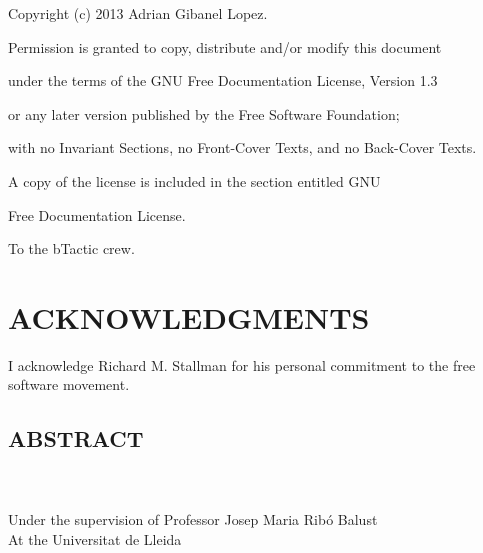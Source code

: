 Copyright (c) 2013 Adrian Gibanel Lopez.

Permission is granted to copy, distribute and/or modify this document

under the terms of the GNU Free Documentation License, Version 1.3

or any later version published by the Free Software Foundation;

with no Invariant Sections, no Front-Cover Texts, and no Back-Cover
Texts.

A copy of the license is included in the section entitled \textquotedbl{}GNU

Free Documentation License\textquotedbl{}.

\newpage



\newpage
\null\vfil
\begin{center}
To the bTactic crew.
\end{center}
\par\vfil\newpage


\chapter*{ACKNOWLEDGMENTS}
I acknowledge Richard M. Stallman for his personal commitment to the free software movement.
\par\newpage





\section* {ABSTRACT}
             \thispagestyle{empty}
                  \addtocounter{page}{-1}
                \begin{center}
                  {\bf\expandafter\uppercase\expandafter{\actualtitle}}\\
                  \vspace{12pt}
                  \actualauthor \\
                  \vspace{12pt}
                  Under the supervision of Professor Josep Maria Rib\'o Balust\\
                  At the Universitat de Lleida
                \end{center}


\pagestyle{headings}

\tableofcontents
\listoffigures
\newpage

\clearpage{} %
